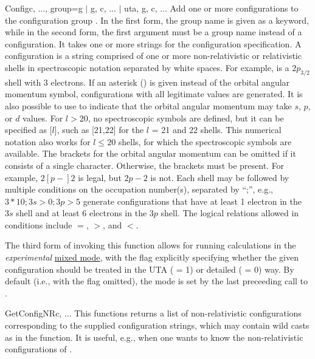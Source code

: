 \begin{fundesc}{Config}{c, ..., group=g $\mid$ g, c, ... $\mid$ uta, g, c, ...}
Add one or more configurations to the configuration group . In the first
form, the group name  is given as a keyword, while in the second form,
the first argument must be a group name instead of a configuration. It takes one
or more strings for the configuration specification. A configuration  is
a string comprised of one or more non-relativistic or relativistic shells in
spectroscopic notation separated by white spaces. For example,  is a
$2p_{3/2}$ shell with 3 electrons. If an asterisk (\key{*}) is given instead of
the orbital angular momentum symbol, configurations with all legitimate values
are generated. It is also possible to use \key{[s,p,d]} to indicate that the
orbital angular momentum may take $s$, $p$, or $d$ values. For $l > 20$, no
spectroscopic symbols are defined, but it can be specified as [$l$], such as
[21,22] for the $l$ = 21 and 22 shells. This numerical notation also works for
$l \le 20$ shells, for which the spectroscopic symbols  are available. The brackets for the
orbital angular momentum can be omitted if it consists of a single character.
Otherwise, the brackets must be present. For example, $2[p-]2$  is legal, but
$2p-2$ is not. Each shell may be followed by multiple conditions on the
occupation number(s), separated by ``;'', e.g., $3*10;3s>0;3p>5$ generate
configurations that have at least 1 electron in the $3s$ shell and at least 6
electrons in the $3p$ shell. The logical relations allowed in conditions
include $=$, $>$, and $<$. 

The third form of invoking this function allows for running calculations in the
{\em experimental} \hyperref[subsec:mixed_mode]{mixed mode}, with the 
flag explicitly specifying whether the given configuration should be treated in
the UTA ( = 1) or detailed ( = 0) way. By default (i.e., with
the  flag omitted), the mode is set by the last preceeding call to
.
\end{fundesc}

\begin{fundesc}{GetConfigNR}{c, ...}
This functions returns a list of non-relativistic configurations corresponding
to the supplied configuration strings, which may contain wild casts as in the
 function. It is useful, e.g., when one wants to know the
non-relativistic configurations of . 
\end{fundesc}

